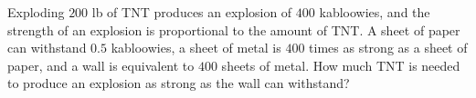 Exploding $200$ lb of TNT produces an explosion of $400$ kabloowies, and the strength of an explosion is proportional to the amount of TNT. A sheet of paper can withstand $0.5$ kabloowies, a sheet of metal is $400$ times as strong as a sheet of paper, and a wall is equivalent to $400$ sheets of metal. How much TNT is needed to produce an explosion as strong as the wall can withstand?
